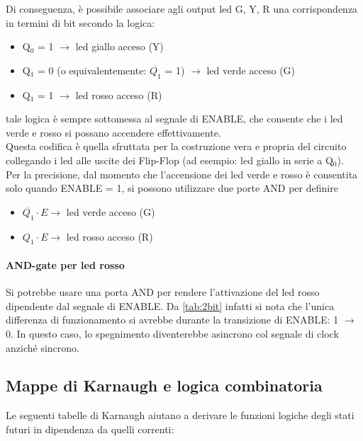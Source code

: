 \documentclass[10pt, a4paper, italian]{article}
\begin{document}
Di conseguenza, è possibile associare agli output led G, Y, R una corrispondenza in termini di bit secondo la logica:
\begin{itemize}
    \item Q$_0$ = 1 $\longrightarrow$ led giallo acceso (Y)
    \item Q$_1$ = 0 (o equivalentemente: $\overline{Q_1}$ = 1) $\longrightarrow$ led verde acceso (G)
    \item Q$_1$ = 1 $\longrightarrow$ led rosso acceso (R)
\end{itemize}
tale logica è sempre sottomessa al segnale di ENABLE, che consente che i led verde e rosso si possano accendere effettivamente. \\

Questa codifica è quella sfruttata per la costruzione vera e propria del circuito collegando i led alle uscite dei Flip-Flop (ad esempio: led giallo in serie a Q$_0$). \\

Per la precisione, dal momento che l'accensione dei led verde e rosso è consentita solo quando ENABLE = 1, si possono utilizzare due porte AND per definire
\begin{itemize}
    \item $\overline{Q_1} \cdot E \longrightarrow$ led verde acceso (G)
    \item $Q_1 \cdot E \longrightarrow$ led rosso acceso (R)
\end{itemize}

\paragraph{AND-gate per led rosso}
Si potrebbe usare una porta AND per rendere l'attivazione del led rosso dipendente dal segnale di ENABLE. Da \cref{tab:2bit} infatti si nota che l'unica differenza di funzionamento si avrebbe durante la transizione di ENABLE: 1 $\rightarrow$ 0. In questo caso, lo spegnimento diventerebbe asincrono col segnale di clock anziché sincrono.

\subsection{Mappe di Karnaugh e logica combinatoria}
Le seguenti tabelle di Karnaugh aiutano a derivare le funzioni logiche degli stati futuri in dipendenza da quelli correnti: \\
\end{document}
